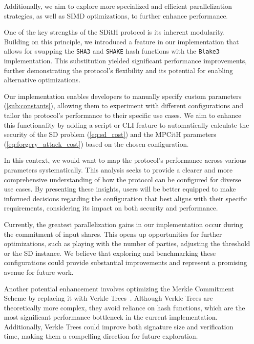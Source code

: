 \documentclass[11pt]{report}
\theoremstyle{definition}
\theoremstyle{plain}
\begin{document}
Additionally, we aim to explore more specialized and efficient parallelization strategies, as well as SIMD optimizations, to further enhance performance.

One of the key strengths of the SDitH protocol is its inherent modularity. Building on this principle, we introduced a feature in our implementation that allows for swapping the \texttt{SHA3} and \texttt{SHAKE} hash functions with the \texttt{Blake3} implementation. This substitution yielded significant performance improvements, further demonstrating the protocol's flexibility and its potential for enabling alternative optimizations.

Our implementation enables developers to manually specify custom parameters (\autoref{sub:constants}), allowing them to experiment with different configurations and tailor the protocol's performance to their specific use cases. We aim to enhance this functionality by adding a script or CLI feature to automatically calculate the security of the SD problem (\autoref{eq:sd_cost}) and the MPCitH parameters (\autoref{eq:forgery_attack_cost}) based on the chosen configuration.

In this context, we would want to map the protocol's performance across various parameters systematically. This analysis seeks to provide a clearer and more comprehensive understanding of how the protocol can be configured for diverse use cases. By presenting these insights, users will be better equipped to make informed decisions regarding the configuration that best aligns with their specific requirements, considering its impact on both security and performance.

Currently, the greatest parallelization gains in our implementation occur during the commitment of input shares. This opens up opportunities for further optimizations, such as playing with the number of parties, adjusting the threshold or the SD instance. We believe that exploring and benchmarking these configurations could provide substantial improvements and represent a promising avenue for future work.

Another potential enhancement involves optimizing the Merkle Commitment Scheme by replacing it with Verkle Trees~\cite{kuszmaul2019verkle, iavich2023verkle}. Although Verkle Trees are theoretically more complex, they avoid reliance on hash functions, which are the most significant performance bottleneck in the current implementation. Additionally, Verkle Trees could improve both signature size and verification time, making them a compelling direction for future exploration.
\end{document}
